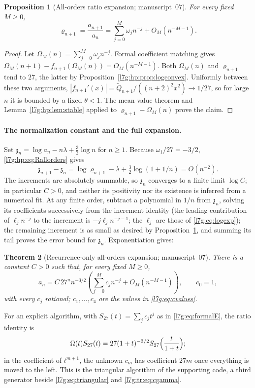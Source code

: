 \documentclass[11pt,letterpaper]{article}
\newtheorem{theorem}{Theorem}[section]
\newtheorem{proposition}[theorem]{Proposition}
\theoremstyle{remark}\newtheorem{remark}[theorem]{Remark}
\newcounter{l7gtrsavedeq}
\begin{document}
\begin{proposition}[All-orders ratio expansion; manuscript~07]\label{l7g:hp:prop:Rallorders}
For every fixed $M\ge0$,
\begin{equation}\label{l7g:hp:eq:Rallorders}
 \varrho_{n+1}=\frac{a_{n+1}}{a_n}=\sum_{j=0}^{M}\omega_jn^{-j}+O_M(n^{-M-1}).
\end{equation}
\end{proposition}
\begin{proof}
Let $\Omega_M(n)=\sum_{j=0}^M\omega_jn^{-j}$. Formal coefficient matching
gives $\Omega_M(n+1)-f_{n+1}(\Omega_M(n))=O_M(n^{-M-1})$. Both $\Omega_M(n)$
and $\varrho_{n+1}$ tend to $27$, the latter by
Proposition~\ref{l7g:hp:prop:logconvex}. Uniformly between these two
arguments, $|f_{n+1}'(x)|=\widetilde Q_{n+1}/((n+2)^2x^2)\to1/27$, so for
large $n$ it is bounded by a fixed $\theta<1$. The mean value theorem and
Lemma~\ref{l7g:hp:lem:stable} applied to $\varrho_{n+1}-\Omega_M(n)$ prove
the claim.
\end{proof}

\paragraph{The normalization constant and the full expansion.}
Set $\mathfrak z_n=\log a_n-n\lambda+\frac32\log n$ for $n\ge1$. Because
$\omega_1/27=-3/2$, \eqref{l7g:hp:eq:Rallorders} gives
\[
 \mathfrak z_{n+1}-\mathfrak z_n=\log\varrho_{n+1}-\lambda+\tfrac32\log(1+1/n)=O(n^{-2}).
\]
The increments are absolutely summable, so $\mathfrak z_n$ converges to a
finite limit $\log C$; in particular $C>0$, and neither its positivity nor
its existence is inferred from a numerical fit. At any finite order,
subtract a polynomial in $1/n$ from $\mathfrak z_n$, solving its
coefficients successively from the increment identity (the leading
contribution of $\ell_jn^{-j}$ to the increment is $-j\ell_jn^{-j-1}$; the
$\ell_j$ are those of \eqref{l7g:eq:logexp}); the remaining increment is as
small as desired by Proposition~\ref{l7g:hp:prop:Rallorders}, and summing
its tail proves the error bound for $\mathfrak z_n$. Exponentiation gives:

\begin{theorem}[Recurrence-only all-orders expansion; manuscript~07]\label{l7g:hp:thm:callorders}
There is a constant $C>0$ such that, for every fixed $M\ge0$,
\begin{equation}\label{l7g:hp:eq:callorders}
 a_n=C\,27^nn^{-3/2}\left(\sum_{j=0}^{M}c_jn^{-j}+O_M(n^{-M-1})\right),
 \qquad c_0=1,
\end{equation}
with every $c_j$ rational; $c_1,\dots,c_4$ are the values in
\eqref{l7g:eq:cvalues}.
\end{theorem}
For an explicit algorithm, with $S_{27}(t)=\sum_jc_jt^j$ as in
\eqref{l7g:eq:formalE}, the ratio identity is
\begin{equation}\label{l7g:hp:eq:AfromB}
 \Omega(t)S_{27}(t)=27(1+t)^{-3/2}S_{27}\Bigl(\frac{t}{1+t}\Bigr);
\end{equation}
in the coefficient of $t^{m+1}$, the unknown $c_m$ has coefficient $27m$
once everything is moved to the left. This is the triangular algorithm of
the supporting code, a third generator beside \eqref{l7g:eq:triangular} and
\eqref{l7g:tr:eq:cgamma}.
\end{document}
